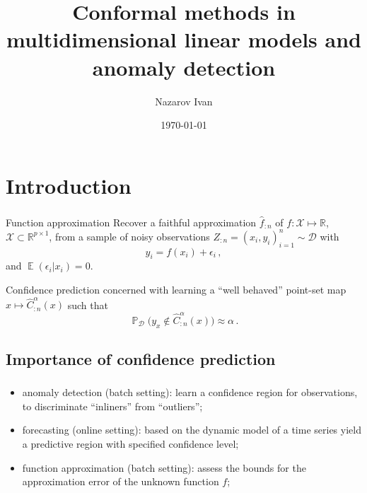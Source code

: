 \documentclass[t]{beamer}  %
\title{Conformal methods in multidimensional linear models and anomaly detection}
\author[Nazarov Ivan]{Nazarov Ivan}
\date{\today}
\institute[Higher School of Economics]{National Research University \\ Higher School of Economics}
\newcommand{\Dcal}{\mathcal{D}}
\newcommand{\Xcal}{\mathcal{X}}
\newcommand{\Real}{\mathbb{R}}
\newcommand{\ex}{\mathop{\mathbb{E}}\nolimits}
\newcommand{\pr}{\mathop{\mathbb{P}}\nolimits}
\begin{document}
\frame[plain]{\titlepage} %

\section{Introduction} %
\label{sec:introduction}

\begin{frame}[c]\frametitle{\insertsection}
  \begin{block}{Function approximation}
    Recover a faithful approximation $\hat{f}_{:n}$ of $f:\Xcal \mapsto \Real$, $\Xcal\subset \Real^{p\times 1}$,
    from a sample of noisy observations $Z_{:n} = (x_i, y_i)_{i=1}^n \sim \Dcal$ with
    $$ y_i = f(x_i) + \epsilon_i \,, $$
    and $\ex(\epsilon_i|x_i) = 0$.
  \end{block}

  \begin{block}{Confidence prediction}
    concerned with learning a ``well behaved'' point-set map $x \mapsto \hat{C}_{:n}^\alpha(x)$
    such that
    $$ \pr_\Dcal\bigl(y_x \notin \hat{C}_{:n}^\alpha(x)\bigr) \approx \alpha \,. $$
  \end{block}
\end{frame}

\subsection{Importance of confidence prediction} %
\label{sub:importance_of_cp}

\begin{frame}[c]\frametitle{\insertsection}
  \framesubtitle{\insertsubsection}
  \begin{itemize}
    \item anomaly detection (batch setting): learn a confidence region for observations,
    to discriminate ``inliners'' from ``outliers'';
    \vspace{\baselineskip}
    \item forecasting (online setting): based on the dynamic model of a time series
    yield a predictive region with specified confidence level;
    \vspace{\baselineskip}
    \item function approximation (batch setting): assess the bounds for the approximation
    error of the unknown function $f$;
  \end{itemize}
\end{frame}
\end{document}
